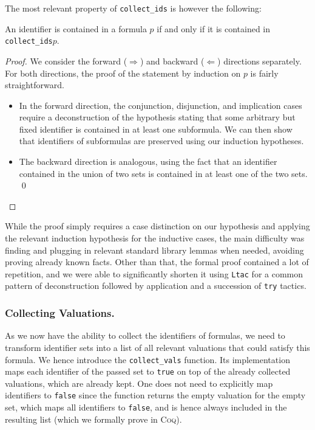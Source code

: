 The most relevant property of \texttt{collect\_ids} is however the following:
\begin{lemma}
    An identifier is contained in a formula $p$ if and only if it is contained in \texttt{collect\_ids\;$p$}.
\end{lemma}
\begin{proof}
    We consider the forward ($\Longrightarrow$) and backward ($\Longleftarrow$) directions separately.
    For both directions, the proof of the statement by induction on $p$ is fairly straightforward.
    \begin{itemize}
        \item In the forward direction, the conjunction, disjunction, and implication cases require a deconstruction of the hypothesis stating that some arbitrary but fixed identifier is contained in at least one subformula.
        We can then show that identifiers of subformulas are preserved using our induction hypotheses.
        \item The backward direction is analogous, using the fact that an identifier contained in the union of two sets is contained in at least one of the two sets. \qed
    \end{itemize}
\end{proof}
While the proof simply requires a case distinction on our hypothesis and applying the relevant induction hypothesis for the inductive cases, the main difficulty was finding and plugging in relevant standard library lemmas when needed, avoiding proving already known facts.
Other than that, the formal proof contained a lot of repetition, and we were able to significantly shorten it using \texttt{Ltac} for a common pattern of deconstruction followed by application and a succession of \texttt{try} tactics.

\subsubsection{Collecting Valuations.}

As we now have the ability to collect the identifiers of formulas, we need to transform identifier sets into a list of all relevant valuations that could satisfy this formula.
We hence introduce the \texttt{collect\_vals} function.
Its implementation maps each identifier of the passed set to \texttt{true} on top of the already collected valuations, which are already kept.
One does not need to explicitly map identifiers to \texttt{false} since the function returns the empty valuation for the empty set, which maps all identifiers to \texttt{false}, and is hence always included in the resulting list (which we formally prove in \textsc{Coq}).

